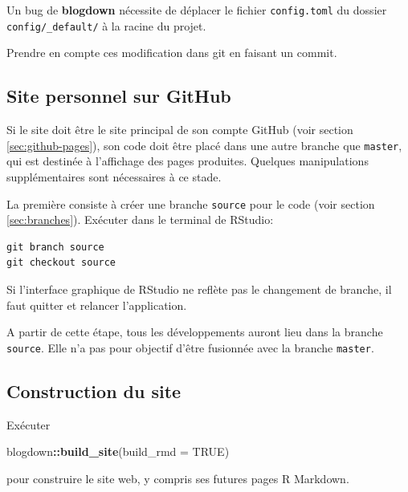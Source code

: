 \documentclass[
  12pt,
  french,
  a4paper,
  extrafontsizes,onecolumn,openright
  ]{memoir}
\newenvironment{Shaded}{\begin{snugshade}}{\end{snugshade}}
\newcommand{\DataTypeTok}[1]{\textcolor[rgb]{0.13,0.29,0.53}{#1}}
\newcommand{\KeywordTok}[1]{\textcolor[rgb]{0.13,0.29,0.53}{\textbf{#1}}}
\newcommand{\NormalTok}[1]{#1}
\newcommand{\OperatorTok}[1]{\textcolor[rgb]{0.81,0.36,0.00}{\textbf{#1}}}
\newcommand{\OtherTok}[1]{\textcolor[rgb]{0.56,0.35,0.01}{#1}}
\newlength{\rf}
\begin{document}
Un bug de \textbf{blogdown} nécessite de déplacer le fichier \texttt{config.toml} du dossier \texttt{config/\_default/} à la racine du projet.

Prendre en compte ces modification dans git en faisant un commit.

\hypertarget{site-personnel-sur-github}{%
\subsection{Site personnel sur GitHub}\label{site-personnel-sur-github}}

Si le site doit être le site principal de son compte GitHub (voir section \ref{sec:github-pages}), son code doit être placé dans une autre branche que \texttt{master}, qui est destinée à l'affichage des pages produites.
Quelques manipulations supplémentaires sont nécessaires à ce stade.

La première consiste à créer une branche \texttt{source} pour le code (voir section \ref{sec:branches}).
Exécuter dans le terminal de RStudio:

\begin{verbatim}
git branch source
git checkout source
\end{verbatim}

Si l'interface graphique de RStudio ne reflète pas le changement de branche, il faut quitter et relancer l'application.

A partir de cette étape, tous les développements auront lieu dans la branche \texttt{source}.
Elle n'a pas pour objectif d'être fusionnée avec la branche \texttt{master}.

\hypertarget{construction-du-site}{%
\subsection{Construction du site}\label{construction-du-site}}

Exécuter

\scriptsize

\begin{Shaded}
\begin{Highlighting}[]
\NormalTok{blogdown}\OperatorTok{::}\KeywordTok{build_site}\NormalTok{(}\DataTypeTok{build_rmd =} \OtherTok{TRUE}\NormalTok{)}
\end{Highlighting}
\end{Shaded}

\normalsize

pour construire le site web, y compris ses futures pages R Markdown.
\end{document}
